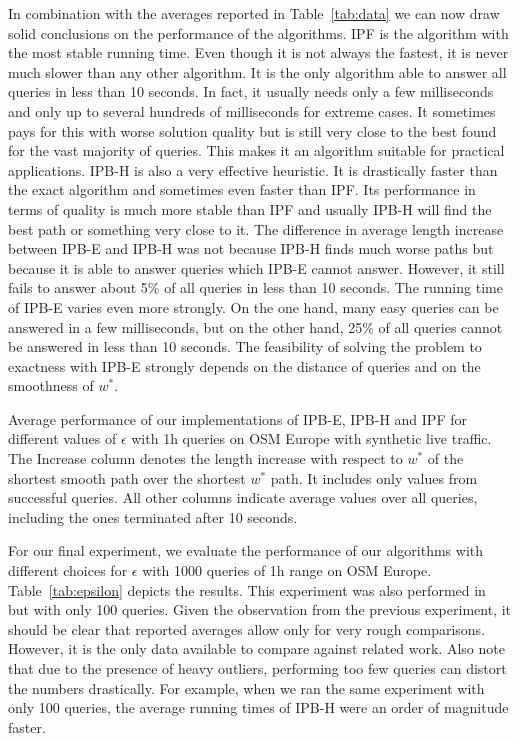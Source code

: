\documentclass[a4paper,UKenglish,cleveref, autoref, thm-restate]{lipics-v2021}
\begin{document}
In combination with the averages reported in Table~\ref{tab:data} we can now draw solid conclusions on the performance of the algorithms.
IPF is the algorithm with the most stable running time.
Even though it is not always the fastest, it is never much slower than any other algorithm.
It is the only algorithm able to answer all queries in less than 10 seconds.
In fact, it usually needs only a few milliseconds and only up to several hundreds of milliseconds for extreme cases.
It sometimes pays for this with worse solution quality but is still very close to the best found for the vast majority of queries.
This makes it an algorithm suitable for practical applications.
IPB-H is also a very effective heuristic.
It is drastically faster than the exact algorithm and sometimes even faster than IPF.
Its performance in terms of quality is much more stable than IPF and usually IPB-H will find the best path or something very close to it.
The difference in average length increase between IPB-E and IPB-H was not because IPB-H finds much worse paths but because it is able to answer queries which IPB-E cannot answer.
However, it still fails to answer about 5\% of all queries in less than 10 seconds.
The running time of IPB-E varies even more strongly.
On the one hand, many easy queries can be answered in a few milliseconds, but on the other hand, 25\% of all queries cannot be answered in less than 10 seconds.
The feasibility of solving the problem to exactness with IPB-E strongly depends on the distance of queries and on the smoothness of $w^*$.

\begin{table}[t]
\centering
\caption{
Average performance of our implementations of IPB-E, IPB-H and IPF for different values of $\epsilon$ with 1h queries on OSM Europe with synthetic live traffic.
The Increase column denotes the length increase with respect to $w^*$ of the shortest smooth path over the shortest $w^*$ path.
It includes only values from successful queries.
All other columns indicate average values over all queries, including the ones terminated after 10 seconds.
}\label{tab:epsilon}

\end{table}

For our final experiment, we evaluate the performance of our algorithms with different choices for $\epsilon$ with 1000 queries of 1h range on OSM Europe.
Table~\ref{tab:epsilon} depicts the results.
This experiment was also performed in~\cite{dss-tarrn-18} but with only 100 queries.
Given the observation from the previous experiment, it should be clear that reported averages allow only for very rough comparisons.
However, it is the only data available to compare against related work.
Also note that due to the presence of heavy outliers, performing too few queries can distort the numbers drastically.
For example, when we ran the same experiment with only 100 queries, the average running times of IPB-H were an order of magnitude faster.
\end{document}
